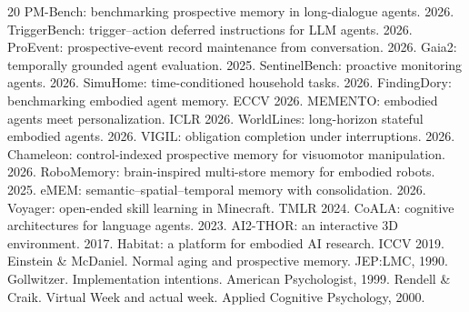 \documentclass[10pt]{article}
\begin{document}
\begin{thebibliography}{20}\small
{} PM-Bench: benchmarking prospective memory in
long-dialogue agents. 2026.
 TriggerBench: trigger--action deferred
instructions for LLM agents. 2026.
 ProEvent: prospective-event record maintenance from
conversation. 2026.
 Gaia2: temporally grounded agent evaluation. 2025.
 SentinelBench: proactive monitoring agents. 2026.
 SimuHome: time-conditioned household tasks. 2026.
 FindingDory: benchmarking embodied agent memory.
ECCV 2026.
 MEMENTO: embodied agents meet personalization. ICLR
2026.
 WorldLines: long-horizon stateful embodied agents.
2026.
 VIGIL: obligation completion under interruptions. 2026.
 Chameleon: control-indexed prospective memory for
visuomotor manipulation. 2026.
 RoboMemory: brain-inspired multi-store memory for
embodied robots. 2025.
 eMEM: semantic--spatial--temporal memory with
consolidation. 2026.
 Voyager: open-ended skill learning in Minecraft. TMLR
2024.
 CoALA: cognitive architectures for language agents. 2023.
 AI2-THOR: an interactive 3D environment. 2017.
 Habitat: a platform for embodied AI research. ICCV
2019.
 Einstein \& McDaniel. Normal aging and prospective
memory. JEP:LMC, 1990.
 Gollwitzer. Implementation intentions. American
Psychologist, 1999.
 Rendell \& Craik. Virtual Week and actual week.
Applied Cognitive Psychology, 2000.
\end{thebibliography}
\end{document}

